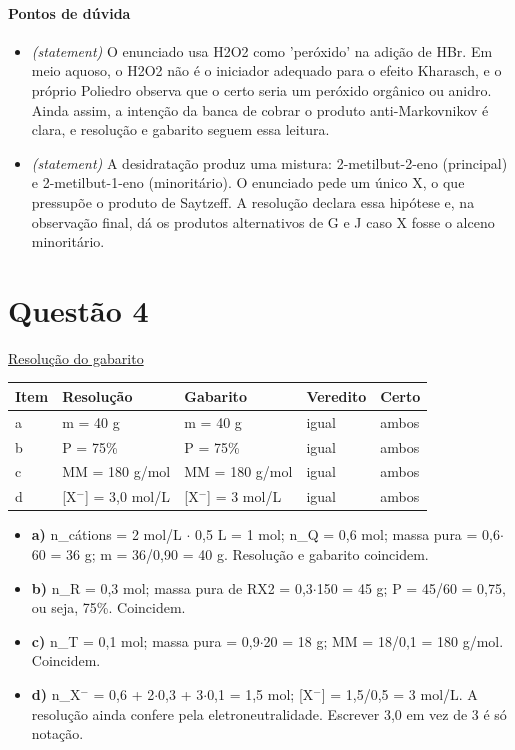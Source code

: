 \documentclass{article}%
\begin{document}
\paragraph{Pontos de dúvida}%
\begin{itemize}%
\item%
\textit{(statement)} O enunciado usa H2O2 como 'peróxido' na adição de HBr. Em meio aquoso, o H2O2 não é o iniciador adequado para o efeito Kharasch, e o próprio Poliedro observa que o certo seria um peróxido orgânico ou anidro. Ainda assim, a intenção da banca de cobrar o produto anti{-}Markovnikov é clara, e resolução e gabarito seguem essa leitura.%
\item%
\textit{(statement)} A desidratação produz uma mistura: 2{-}metilbut{-}2{-}eno (principal) e 2{-}metilbut{-}1{-}eno (minoritário). O enunciado pede um único X, o que pressupõe o produto de Saytzeff. A resolução declara essa hipótese e, na observação final, dá os produtos alternativos de G e J caso X fosse o alceno minoritário.%
\end{itemize}%
\section*{Questão 4}%
\href{https://poliedroresolve.sistemapoliedro.com.br/vestibulares/ita/2027/ita-2-fase-dia-2-21-10-2026-2-fase-dia-2/dissertativa-4-quimica-2-fase-dia-2-ita-2027}{Resolução do gabarito}\par\smallskip%
\begin{longtable}{@{}p{} p{} p{} p{} p{}@{}}\toprule Item & Resolução & Gabarito & Veredito & Certo \\ \midrule
a & m = 40 g & m = 40 g & igual & ambos \\
b & P = 75\% & P = 75\% & igual & ambos \\
c & MM = 180 g/mol & MM = 180 g/mol & igual & ambos \\
d & {[}X$^{-}${]} = 3,0 mol/L & {[}X$^{-}${]} = 3 mol/L & igual & ambos \\
\bottomrule\end{longtable}%
\begin{itemize}%
\item%
\textbf{a)} n\_cátions = 2 mol/L $\cdot$ 0,5 L = 1 mol; n\_Q = 0,6 mol; massa pura = 0,6$\cdot$60 = 36 g; m = 36/0,90 = 40 g. Resolução e gabarito coincidem.%
\item%
\textbf{b)} n\_R = 0,3 mol; massa pura de RX2 = 0,3$\cdot$150 = 45 g; P = 45/60 = 0,75, ou seja, 75\%. Coincidem.%
\item%
\textbf{c)} n\_T = 0,1 mol; massa pura = 0,9$\cdot$20 = 18 g; MM = 18/0,1 = 180 g/mol. Coincidem.%
\item%
\textbf{d)} n\_X$^{-}$ = 0,6 + 2$\cdot$0,3 + 3$\cdot$0,1 = 1,5 mol; {[}X$^{-}${]} = 1,5/0,5 = 3 mol/L. A resolução ainda confere pela eletroneutralidade. Escrever 3,0 em vez de 3 é só notação.%
\end{itemize}%
\end{document}
